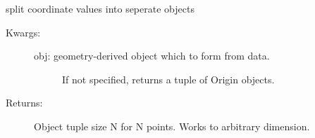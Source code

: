 \documentclass[letterpaper,10pt,english]{sphinxmanual}
\begin{document}
\begin{fulllineitems}
\begin{fulllineitems}
\begin{description}
\end{description}

\end{fulllineitems}


\begin{fulllineitems}
\label{TRIPPy:TRIPPy.geometry.Origin.split}
split coordinate values into seperate objects
\begin{description}
\item[{Kwargs:}] \leavevmode\begin{description}
\item[{obj: geometry-derived object which to form from data.}] \leavevmode
If not specified, returns a tuple of Origin objects.

\end{description}

\item[{Returns:}] \leavevmode
Object tuple size N for N points. Works to arbitrary
dimension.

\end{description}

\end{fulllineitems}


\end{fulllineitems}

\end{document}
